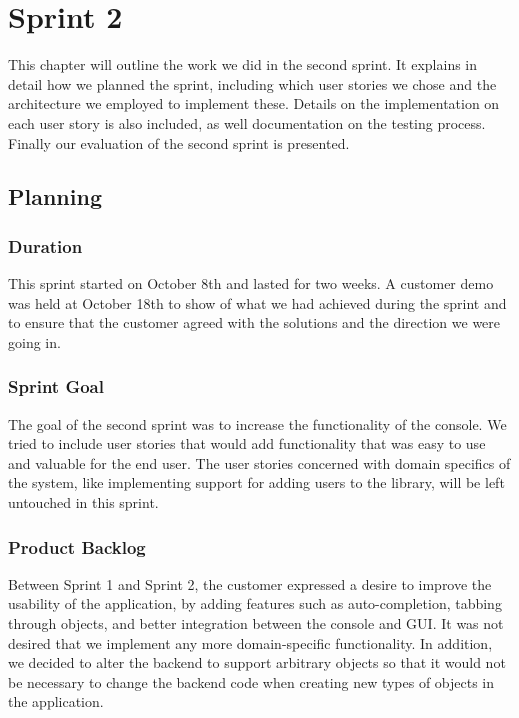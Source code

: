 \chapter{Sprint 2}

\minitoc

This chapter will outline the work we did in the second sprint. It explains in detail how we planned the sprint, including which user stories we chose and the architecture we employed to implement these. Details on the implementation on each user story is also included, as well documentation on the testing process. Finally our evaluation of the second sprint is presented. 

\clearpage

\section{Planning}

\subsection{Duration}
This sprint started on October 8th and lasted for two weeks. A customer demo was held at October 18th to show of what we had achieved during the sprint and to ensure that the customer agreed with the solutions and the direction we were going in.

\subsection{Sprint Goal}
The goal of the second sprint was to increase the functionality of the console. We tried to include user stories that would add functionality that was easy to use and valuable for the end user. The user stories concerned with domain specifics of the system, like implementing support for adding users to the library, will be left untouched in this sprint.

\subsection{Product Backlog} 
Between Sprint 1 and Sprint 2, the customer expressed a desire to improve the usability of the application, by adding features such as auto-completion, tabbing through objects, and better integration between the console and GUI. It was not desired that we implement any more domain-specific functionality. In addition, we decided to alter the backend to support arbitrary objects so that it would not be necessary to change the backend code when creating new types of objects in the application. 

